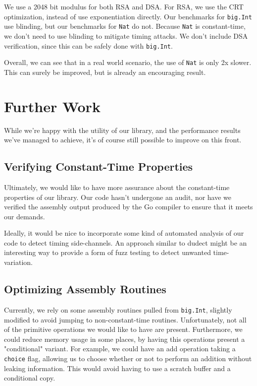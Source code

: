 \documentclass[11pt, a4paper]{article} %
\begin{document}
{We use a 2048 bit modulus for both RSA and DSA. For RSA, we use
the CRT optimization, instead of use exponentiation directly.
Our benchmarks for \texttt{big.Int} use blinding, but our benchmarks
for \texttt{Nat} do not. Because \texttt{Nat} is constant-time,
we don't need to use blinding to mitigate timing attacks.
We don't include DSA verification, since this can be safely done
with \texttt{big.Int}.

Overall, we can see that in a real world scenario, the use
of \texttt{Nat} is only 2x slower. This can surely be improved,
but is already an encouraging result.

\section{Further Work}

While we're happy with the utility of our library,
and the performance results we've managed to achieve, it's
of course still possible to improve on this front.

\subsection{Verifying Constant-Time Properties}

Ultimately, we would like to have more assurance about the
constant-time properties of our library. Our code hasn't
undergone an audit, nor have we verified the assembly output
produced by the Go compiler to ensure that it meets our demands.

Ideally, it would be nice to incorporate some kind of automated
analysis of our code to detect timing side-channels. An approach
similar to dudect
\cite{reparaz_dude_2017} 
might be an interesting way to provide a form of fuzz testing
to detect unwanted time-variation.

\subsection{Optimizing Assembly Routines}

Currently, we rely on some assembly routines pulled from
\texttt{big.Int}, slightly modified to avoid jumping to non-constant-time
routines. Unfortunately, not all of the primitive operations we would
like to have are present. Furthermore, we could reduce memory usage
in some places, by having this operations present a "conditional"
variant. For example, we could have an add operation taking a
\texttt{choice} flag, allowing us to choose whether or not to perform
an addition without leaking information. This would avoid having
to use a scratch buffer and a conditional copy.

}
\end{document}
